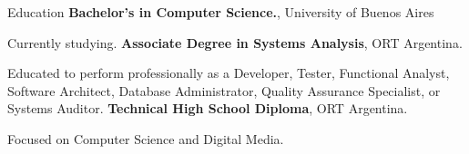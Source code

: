 \begin{rubric}{Education}
\entry*[2022 -- act.]%
	\textbf{Bachelor's in Computer Science.}, University of Buenos Aires\par
Currently studying.
\entry*[2020 -- 2021]%
	\textbf{Associate Degree in Systems Analysis}, ORT Argentina.\par
Educated to perform professionally as a Developer, Tester, Functional Analyst, Software Architect, Database Administrator, Quality Assurance Specialist, or Systems Auditor.
\entry*[2013 -- 2018]%
	\textbf{Technical High School Diploma}, ORT Argentina.
	\par  Focused on Computer Science and Digital Media.
\end{rubric}